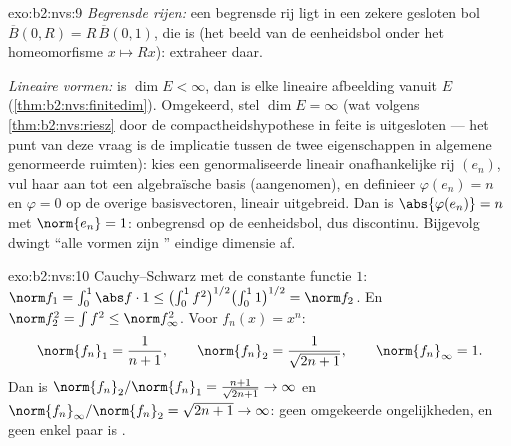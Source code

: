 \begin{solution}{exo:b2:nvs:9}
\emph{Begrensde rijen:} een begrensde rij ligt in een zekere
gesloten bol $\overline B(0, R) = R\,\overline B(0,1)$, die 
is (het beeld van de  eenheidsbol onder het homeomorfisme
$x \mapsto Rx$): extraheer daar.

\emph{Lineaire vormen:} is $\dim E < \infty$, dan is elke lineaire
afbeelding vanuit $E$  (\cref{thm:b2:nvs:finitedim}).
Omgekeerd, stel $\dim E = \infty$ (wat volgens
\cref{thm:b2:nvs:riesz} door de compactheidshypothese in feite is
uitgesloten --- het punt van deze vraag is de implicatie tussen de
twee eigenschappen in algemene genormeerde ruimten): kies een
genormaliseerde lineair onafhankelijke rij $(e_n)$, vul haar aan
tot een algebraïsche basis (aangenomen), en definieer $\varphi(e_n)
= n$ en $\varphi = 0$ op de overige basisvectoren, lineair
uitgebreid. Dan is $\abs{\varphi(e_n)} = n$ met $\norm{e_n} = 1$:
onbegrensd op de eenheidsbol, dus discontinu. Bijgevolg dwingt
``alle vormen zijn '' eindige dimensie af.
\end{solution}

\begin{solution}{exo:b2:nvs:10}
Cauchy--Schwarz met de constante functie $1$: $\norm f_1 = \int_0^1
\abs f\cdot 1 \leq \bigl(\int_0^1 f^2\bigr)^{1/2}\bigl(\int_0^1
1\bigr)^{1/2} = \norm f_2$. En $\norm f_2^2 = \int f^2 \leq \norm
f_\infty^2$. Voor $f_n(x) = x^n$:
\[
\norm{f_n}_1 = \frac1{n+1}, \qquad
\norm{f_n}_2 = \frac1{\sqrt{2n+1}}, \qquad
\norm{f_n}_\infty = 1 .
\]
Dan is $\norm{f_n}_2/\norm{f_n}_1 = \frac{n+1}{\sqrt{2n+1}} \to
\infty$ en $\norm{f_n}_\infty/\norm{f_n}_2 = \sqrt{2n+1} \to
\infty$: geen omgekeerde ongelijkheden, en geen enkel paar is
.
\end{solution}

